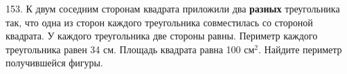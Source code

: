 153. К двум соседним сторонам квадрата приложили два {\bf разных} треугольника так, что одна из сторон каждого треугольника совместилась со стороной квадрата. У каждого треугольника две стороны равны. Периметр каждого треугольника равен 34 см. Площадь квадрата равна 100 $\text{см}^2.$ Найдите периметр получившейся фигуры.\\
